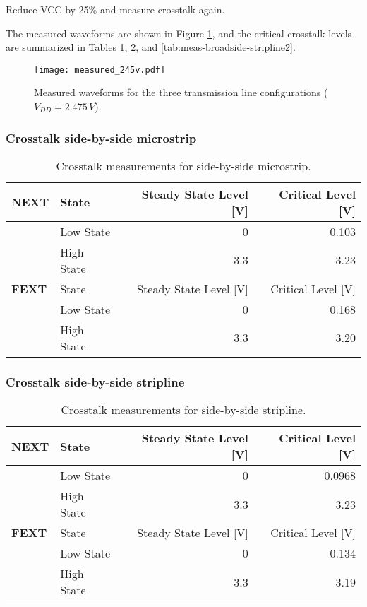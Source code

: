 \documentclass[../main.tex]{subfiles}
\begin{document}
Reduce VCC by 25\% and measure crosstalk again.

\solution

The measured waveforms are shown in Figure \ref{fig:meas-waveforms2}, and the critical crosstalk levels are summarized in Tables \ref{tab:meas-side-by-side-microstrip2}, \ref{tab:meas-side-by-side-stripline2}, and \ref{tab:meas-broadside-stripline2}.

\begin{figure}[h]
    \centering
    \texttt{[image: measured\_245v.pdf]}
    \caption{Measured waveforms for the three transmission line configurations ($V_{DD} = 2.475\,\si{V}$).}
    \label{fig:meas-waveforms2}
\end{figure}

\subsubsection{Crosstalk side-by-side microstrip}

\begin{table}[h]
    \centering
    \begin{tabular}{l l|r r}
        \toprule[1pt]
        \textbf{NEXT} & State & Steady State Level [V] & Critical Level [V] \\
        \midrule
        & Low State & 0 & 0.103 \\
        & High State & 3.3 & 3.23 \\
        \midrule[1pt]
        \textbf{FEXT} & State & Steady State Level [V] & Critical Level [V] \\
        \midrule
        & Low State & 0 & 0.168 \\
        & High State & 3.3 & 3.20 \\
        \bottomrule[1pt]
    \end{tabular}
    \caption{Crosstalk measurements for side-by-side microstrip.}
    \label{tab:meas-side-by-side-microstrip2}
\end{table}

\subsubsection{Crosstalk side-by-side stripline}

\begin{table}[h]
    \centering
    \begin{tabular}{l l|r r}
        \toprule[1pt]
        \textbf{NEXT} & State & Steady State Level [V] & Critical Level [V] \\
        \midrule
        & Low State & 0 & 0.0968 \\
        & High State & 3.3 & 3.23 \\
        \midrule[1pt]
        \textbf{FEXT} & State & Steady State Level [V] & Critical Level [V] \\
        \midrule
        & Low State & 0 & 0.134 \\
        & High State & 3.3 & 3.19 \\
        \bottomrule[1pt]
    \end{tabular}
    \caption{Crosstalk measurements for side-by-side stripline.}
    \label{tab:meas-side-by-side-stripline2}
\end{table}
\end{document}

